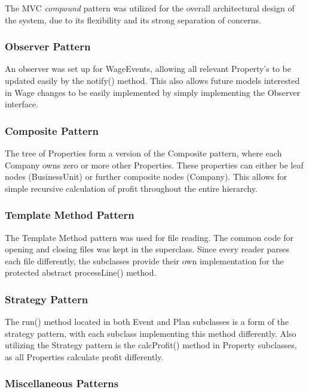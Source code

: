 \documentclass[]{article}
\begin{document}
The MVC \textit{compound} pattern was utilized for the overall architectural design of the system, due to its flexibility and its strong separation of concerns.

\subsubsection*{Observer Pattern}

An observer was set up for WageEvents, allowing all relevant Property's to be updated easily by the notify() method. This also allows future models interested in Wage changes to be easily implemented by simply implementing the Observer interface.

\subsubsection*{Composite Pattern}

The tree of Properties form a version of the Composite pattern, where each Company owns zero or more other Properties. These properties can either be leaf nodes (BusinessUnit) or further composite nodes (Company). This allows for simple recursive calculation of profit throughout the entire hierarchy.

\subsubsection*{Template Method Pattern}

The Template Method pattern was used for file reading. The common code for opening and closing files was kept in the superclass. Since every reader parses each file differently, the subclasses provide their own implementation for the protected abstract processLine() method.

\subsubsection*{Strategy Pattern}

The run() method located in both Event and Plan subclasses is a form of the strategy pattern, with each subclass implementing this method differently. Also utilizing the Strategy pattern is the calcProfit() method in Property subclasses, as all Properties calculate profit differently.

\subsubsection*{Miscellaneous Patterns}
\end{document}
